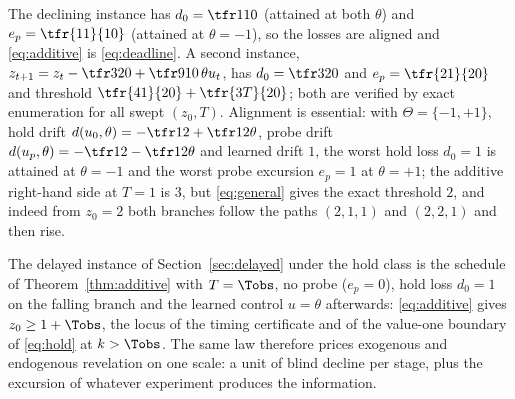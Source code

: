 \begin{example}\label{ex:additive}
The declining instance has $d_0=\tfr1{10}$ (attained at both $\theta$) and $e_p=\tfr{11}{10}$ (attained at $\theta=-1$), so the losses are aligned and \eqref{eq:additive} is \eqref{eq:deadline}. A second instance, $z_{t+1}=z_t-\tfr3{20}+\tfr9{10}\,\theta u_t$, has $d_0=\tfr3{20}$ and $e_p=\tfr{21}{20}$ and threshold $\tfr{41}{20}+\tfr{3T}{20}$; both are verified by exact enumeration for all swept $(z_0,T)$. Alignment is essential: with $\Theta=\{-1,+1\}$, hold drift $d(u_0,\theta)=-\tfr12+\tfr12\theta$, probe drift $d(u_p,\theta)=-\tfr12-\tfr12\theta$ and learned drift $1$, the worst hold loss $d_0=1$ is attained at $\theta=-1$ and the worst probe excursion $e_p=1$ at $\theta=+1$; the additive right-hand side at $T=1$ is $3$, but \eqref{eq:general} gives the exact threshold $2$, and indeed from $z_0=2$ both branches follow the paths $(2,1,1)$ and $(2,2,1)$ and then rise.
\end{example}

\begin{remark}\label{rem:delayedschedule}
The delayed instance of Section~\ref{sec:delayed} under the hold class is the schedule of Theorem~\ref{thm:additive} with $T=\Tobs$, no probe ($e_p=0$), hold loss $d_0=1$ on the falling branch and the learned control $u=\theta$ afterwards: \eqref{eq:additive} gives $z_0\ge1+\Tobs$, the locus of the timing certificate and of the value-one boundary of \eqref{eq:hold} at $k>\Tobs$. The same law therefore prices exogenous and endogenous revelation on one scale: a unit of blind decline per stage, plus the excursion of whatever experiment produces the information.
\end{remark}
